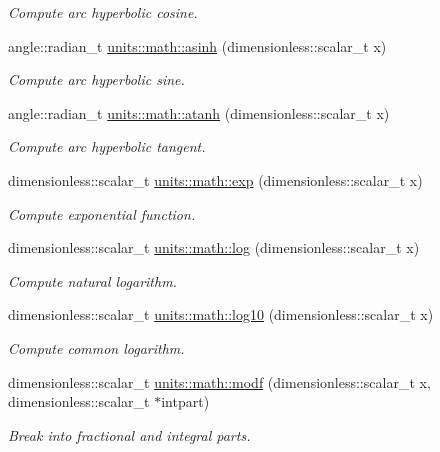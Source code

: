 \begin{DoxyCompactItemize}
\begin{DoxyCompactList}\small\item\em Compute arc hyperbolic cosine. \end{DoxyCompactList}\item 
angle\+::radian\+\_\+t \hyperlink{group___unit_math_gae8f851e6ce59afb43363a1060df055e9}{units\+::math\+::asinh} (dimensionless\+::scalar\+\_\+t x)
\begin{DoxyCompactList}\small\item\em Compute arc hyperbolic sine. \end{DoxyCompactList}\item 
angle\+::radian\+\_\+t \hyperlink{group___unit_math_ga67f5920c8455673eff954191e2f1ab5b}{units\+::math\+::atanh} (dimensionless\+::scalar\+\_\+t x)
\begin{DoxyCompactList}\small\item\em Compute arc hyperbolic tangent. \end{DoxyCompactList}\item 
dimensionless\+::scalar\+\_\+t \hyperlink{group___unit_math_gaf2dcf51e16199a76191d15a3dc25b09e}{units\+::math\+::exp} (dimensionless\+::scalar\+\_\+t x)
\begin{DoxyCompactList}\small\item\em Compute exponential function. \end{DoxyCompactList}\item 
dimensionless\+::scalar\+\_\+t \hyperlink{group___unit_math_gaa5546fee0dc5605e81f9043ca9c6824e}{units\+::math\+::log} (dimensionless\+::scalar\+\_\+t x)
\begin{DoxyCompactList}\small\item\em Compute natural logarithm. \end{DoxyCompactList}\item 
dimensionless\+::scalar\+\_\+t \hyperlink{group___unit_math_ga45faebb72bfc8a22e2ff5539dbb70655}{units\+::math\+::log10} (dimensionless\+::scalar\+\_\+t x)
\begin{DoxyCompactList}\small\item\em Compute common logarithm. \end{DoxyCompactList}\item 
dimensionless\+::scalar\+\_\+t \hyperlink{group___unit_math_ga86079fd9cf2ca37075ae5628a812f6c8}{units\+::math\+::modf} (dimensionless\+::scalar\+\_\+t x, dimensionless\+::scalar\+\_\+t $\ast$intpart)
\begin{DoxyCompactList}\small\item\em Break into fractional and integral parts. \end{DoxyCompactList}\item 

\end{DoxyCompactItemize}
